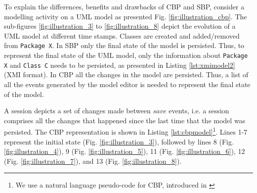 \documentclass{llncs}
\begin{document}
\vspace{-10pt}
To explain the differences, benefits and drawbacks of CBP and SBP, consider a modelling activity on a UML model as presented Fig. \ref{fig:illustration_cbp}. The sub-figures \ref{fig:illustration_3} to \ref{fig:illustration_8} depict the evolution of a UML model at different time stamps. Classes are created and added/removed from \texttt{Package X}. In SBP only the final state of the model is persisted. Thus, to represent the final state of the UML model, only the information about \texttt{Package X} and \texttt{Class C} needs to be persisted, as presented in Listing \ref{lst:xmimodel2} (XMI format). In CBP all the changes in the model are persisted. Thus, a list of all the events generated by the model editor is needed to represent the final state of the model.

A session depicts a set of changes made between $save$ events, i.e. a session comprises all the changes that happened since the last time that the model was persisted. The CBP representation is shown in Listing \ref{lst:cbpmodel}\footnote{We use a natural language pseudo-code for CBP, introduced in \cite{DBLP:conf/models/YohannisKP17,yohannis2018towards}}. Lines 1-7 represent the initial state (Fig. \ref{fig:illustration_3}), followed by lines 8 (Fig. \ref{fig:illustration_4}), 9 (Fig. \ref{fig:illustration_5}), 11 (Fig. \ref{fig:illustration_6}), 12 (Fig. \ref{fig:illustration_7}), and 13 (Fig. \ref{fig:illustration_8}). 
\end{document}
